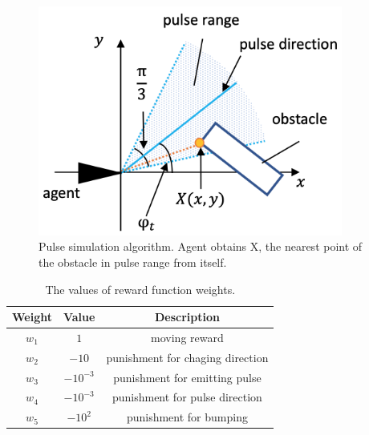 \documentclass[../main]{subfiles}
\begin{document}
\newpage
{}
\begin{figure}[H]
  \centering
  \vfill
  \includegraphics[width=10cm]{figures/pulse_simulation.png}
  \caption{
    Pulse simulation algorithm. Agent obtains X,
    the nearest point of the obstacle in pulse range from itself.
  }\label{fig:pulse_simulation}
\end{figure}


\newpage
{}
\begin{table}[H]
  \caption{The values of reward function weights.}
  \label{tab:reward_weights}
  \centering
    \begin{tabular}{c|c|c}
      Weight & Value      & Description \\ \hline
      $w_1$  & $1$        & moving reward\\
      $w_2$  & $-10$      & punishment for chaging direction\\
      $w_3$  & $-10^{-3}$ & punishment for emitting pulse \\
      $w_4$  & $-10^{-3}$ & punishment for pulse direction\\
      $w_5$  & $-10^2$    & punishment for bumping\\
    \end{tabular}
\end{table}
\end{document}
